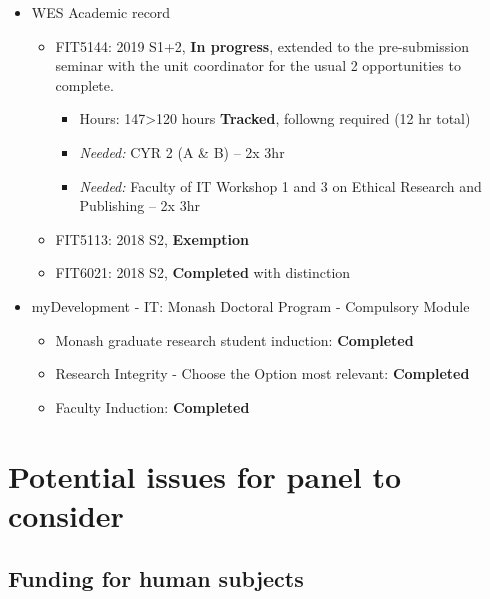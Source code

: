 \documentclass[11,]{article}
\providecommand{\tightlist}{%
  \setlength{\itemsep}{0pt}\setlength{\parskip}{0pt}}
\begin{document}
\begin{itemize}
\tightlist
\item
  WES Academic record

  \begin{itemize}
  \tightlist
  \item
    FIT5144: 2019 S1+2, \textbf{In progress}, extended to the pre-submission seminar with the unit coordinator for the usual 2 opportunities to complete.

    \begin{itemize}
    \tightlist
    \item
      Hours: 147\textgreater120 hours \textbf{Tracked}, followng required (12 hr total)
    \item
      \emph{Needed:} CYR 2 (A \& B) -- 2x 3hr
    \item
      \emph{Needed:} Faculty of IT Workshop 1 and 3 on Ethical Research and Publishing -- 2x 3hr
    \end{itemize}
  \item
    FIT5113: 2018 S2, \textbf{Exemption}
  \item
    FIT6021: 2018 S2, \textbf{Completed} with distinction
  \end{itemize}
\item
  myDevelopment - IT: Monash Doctoral Program - Compulsory Module

  \begin{itemize}
  \tightlist
  \item
    Monash graduate research student induction: \textbf{Completed}
  \item
    Research Integrity - Choose the Option most relevant: \textbf{Completed}
  \item
    Faculty Induction: \textbf{Completed}
  \end{itemize}
\end{itemize}

\hypertarget{potential-issues-for-panel-to-consider}{%
\section{Potential issues for panel to consider}\label{potential-issues-for-panel-to-consider}}

\hypertarget{funding-for-human-subjects}{%
\subsection{Funding for human subjects}\label{funding-for-human-subjects}}
\end{document}
